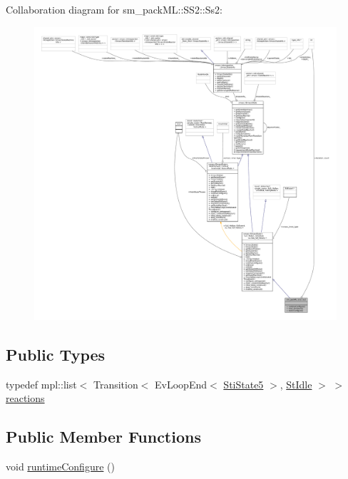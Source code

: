 Collaboration diagram for sm\+\_\+pack\+ML\+:\+:S\+S2\+:\+:Ss2\+:
\nopagebreak
\begin{figure}[H]
\begin{center}
\leavevmode
\includegraphics[width=350pt]{structsm__packML_1_1SS2_1_1Ss2__coll__graph}
\end{center}
\end{figure}
\subsection*{Public Types}
\begin{DoxyCompactItemize}
\item 
typedef mpl\+::list$<$ Transition$<$ Ev\+Loop\+End$<$ \hyperlink{structsm__packML_1_1ss2__states_1_1StiState5}{Sti\+State5} $>$, \hyperlink{structsm__packML_1_1StIdle}{St\+Idle} $>$ $>$ \hyperlink{structsm__packML_1_1SS2_1_1Ss2_a8507cd14b5a00a1b3abb7b8f9607517d}{reactions}
\end{DoxyCompactItemize}
\subsection*{Public Member Functions}
\begin{DoxyCompactItemize}
\item 
void \hyperlink{structsm__packML_1_1SS2_1_1Ss2_a564c91ec6c49303cd3631cc233e9969a}{runtime\+Configure} ()
\end{DoxyCompactItemize}
